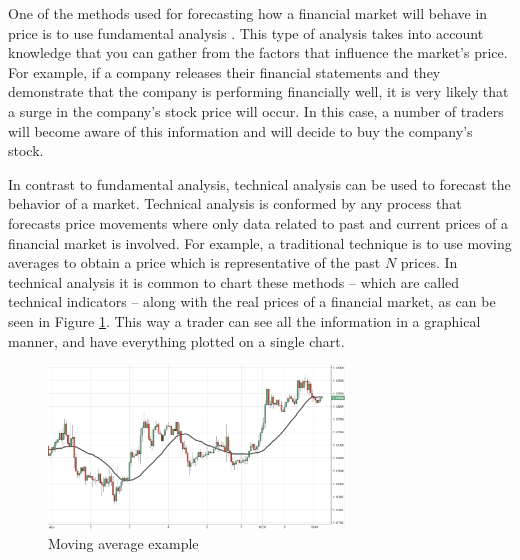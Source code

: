 One of the methods used for forecasting how a financial market will behave in
price is to use fundamental analysis \cite{Kadiri2015}. This type of analysis takes into %
account knowledge that you can gather from the factors that influence the %
market's price. For example, if a company releases their financial statements
and they demonstrate that the company is performing financially well, it is very
likely that a surge in the company's stock price will occur. In this case, a
number of traders will become aware of this information and will decide to buy
the company's stock.

In contrast to fundamental analysis, technical analysis can be used to forecast
the behavior of a market. Technical analysis is conformed by any process that
forecasts price movements where only data related to past and current prices of
a financial market is involved. For example, a traditional technique is to use
moving averages to obtain a price which is representative of the past $N$
prices. In technical analysis it is common to chart these methods -- which are
called technical indicators -- along with the real prices of a financial market,
as can be seen in Figure \ref{figure:moving-average-example}. This way a trader
can see all the information in a graphical manner, and have everything plotted
on a single chart.

\begin{figure}
  \centering
  \includegraphics[width=0.7\textwidth]{img/moving-average.png}
  \caption{Moving average example}
  \label{figure:moving-average-example}
\end{figure}

